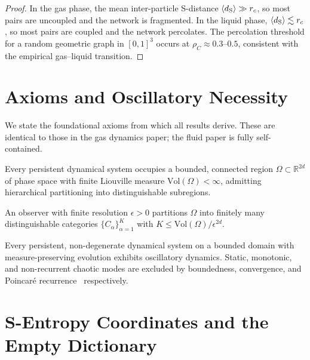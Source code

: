 \begin{proof}
In the gas phase, the mean inter-particle S-distance $\langle d_{\mathrm{S}} \rangle \gg r_c$, so most pairs are uncoupled and the network is fragmented. In the liquid phase, $\langle d_{\mathrm{S}} \rangle \lesssim r_c$, so most pairs are coupled and the network percolates. The percolation threshold for a random geometric graph in $[0,1]^3$ occurs at $\rho_C \approx 0.3$--$0.5$, consistent with the empirical gas--liquid transition.
\end{proof}

\section{Axioms and Oscillatory Necessity}
\label{sec:axioms}

We state the foundational axioms from which all results derive. These are identical to those in the gas dynamics paper; the fluid paper is fully self-contained.

\begin{axiom}
\label{ax:bounded}
Every persistent dynamical system occupies a bounded, connected region $\Omega \subset \mathbb{R}^{2d}$ of phase space with finite Liouville measure $\mathrm{Vol}(\Omega) < \infty$, admitting hierarchical partitioning into distinguishable subregions.
\end{axiom}

\begin{axiom}
\label{ax:categorical}
An observer with finite resolution $\epsilon > 0$ partitions $\Omega$ into finitely many distinguishable categories $\{C_\alpha\}_{\alpha=1}^{K}$ with $K \leq \mathrm{Vol}(\Omega)/\epsilon^{2d}$.
\end{axiom}

\begin{theorem}
\label{thm:oscillatory}
Every persistent, non-degenerate dynamical system on a bounded domain with measure-preserving evolution exhibits oscillatory dynamics. Static, monotonic, and non-recurrent chaotic modes are excluded by boundedness, convergence, and Poincar\'{e} recurrence~\cite{poincare1890} respectively.
\end{theorem}

\section{S-Entropy Coordinates and the Empty Dictionary}
\label{sec:s_coords}

